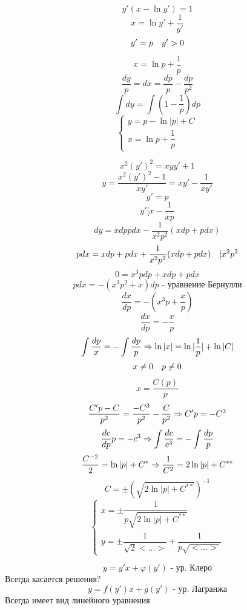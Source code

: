 \documentclass[12pt, fleqn]{article}
\begin{document}
    \begin{Example}[267-286]
      \[y'(x-\ln y') = 1\]
      \[x = \ln y' + \dfrac{1}{y'}\]
      \[y' = p \quad y' > 0\]
      \[x = \ln p + \dfrac{1}{p}\]
      \[\dfrac{dy}{p} = dx = \dfrac{dp}{p} - \dfrac{dp}{p^2}\]
      \[\int dy = \int (1-\dfrac{1}{p}) dp\]
      \[\begin{cases}
        y = p - \ln |p| + C\\
        x = \ln p + \dfrac{1}{p}
      \end{cases}\]
    \end{Example}

    \begin{Example}[280]
      \[x^2 (y')^2 = xyy' + 1\]
      \[y = \dfrac{x^2 (y')^2 - 1}{x y'} = xy' - \dfrac{1}{xy'}\]
      \[y' = p\]
      \[y ' [x - \dfrac{1}{xp}\]
      \[dy = x dp p dx - \dfrac{1}{x^2 p^2} (x dp + p dx)\]
      \[p dx = x dp + p dx + \dfrac{1}{x^2 p^2} (x dp + p dx)\quad | x^2 p^2\]
      \[0 = x^3 p dp + x dp + p dx\]
      \[p dx = -(x^3 p^2 + x) dp \text{ - уравнение Бернулли}\]
      \[\dfrac{dx}{dp} = -(x^3 p + \dfrac{x}{p})\]
      \[\dfrac{dx}{dp} = - \dfrac{x}{p}\]
      \[\int \dfrac{dp}{x} = - \int \dfrac{dp}{p} \Rightarrow \ln |x| = \ln |\dfrac{1}{p}| + \ln|C|\]
      \[x \neq 0 \quad p \neq 0\]
      \[x = \dfrac{C(p)}{p}\]
      \[\dfrac{C'p - C}{p^2} = \dfrac{-C^3}{p^2} - \dfrac{C}{p^2} \Rightarrow C'p = - C^3\]
      \[\dfrac{dc}{dp} p = - c^3 \Rightarrow \int \dfrac{dc}{c^3} = - \int \dfrac{dp}{p}\]
      \[\dfrac{C^{-2}}{2} = \ln|p| + C^* \Rightarrow \dfrac{1}{C^2} = 2 \ln|p| + C^{**}\]
      \[C = \pm (\sqrt{2 \ln|p| + C^{**}})^{-1} \]
      \[\begin{cases}
        x = \pm \dfrac{1}{p\sqrt{2 \ln|p| + C^{**}}}\\
        y = \pm \dfrac{1}{\sqrt 2 <...>} + \dfrac{1}{p \sqrt{<...>}}
      \end{cases}\]
    \end{Example}

    \begin{Example}
      \[y = y' x + \varphi(y') \text{ - ур. Клеро}\]
      Всегда касается решения?
      \[y = f(y')x + g(y') \text{ - ур. Лагранжа}\]
      Всегда имеет вид линейного уравнения
    \end{Example}
\end{document}
